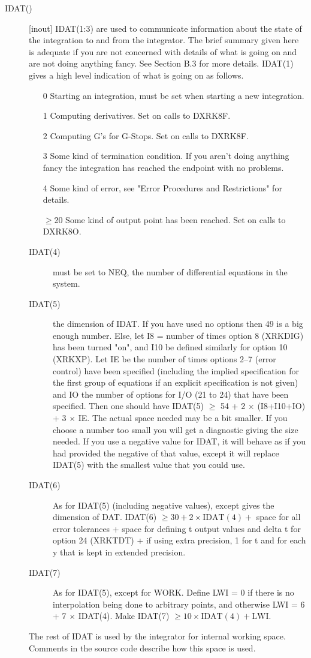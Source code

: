 \documentclass[twoside]{MATH77}
\begin{document}
\begin{description}
\item[IDAT()] [inout] IDAT(1:3) are used to communicate information
  about the state of the integration to and from the integrator.  The
  brief summary given here is adequate if you are not concerned with
  details of what is going on and are not doing anything fancy.  See
  Section B.3 for more details.  IDAT(1) gives a high level indication
  of what is going on as follows.
\begin{itemize}
\item[0] Starting an integration, must be set when starting a new
integration.
\item[1] Computing derivatives.  Set on calls to DXRK8F.
\item[2] Computing G's for G-Stops.  Set on calls to DXRK8F.
\item[3] Some kind of termination condition.  If you aren't doing
anything fancy the integration has reached the endpoint with no problems.
\item[4] Some kind of error, see "Error Procedures and
Restrictions" for details.
\item[$\geq$20] Some kind of output point has been reached.  Set on
calls to DXRK8O.
\end{itemize}
\begin{description}
\item[IDAT(4)] must be set to NEQ, the number of differential equations in
the system.
\item[IDAT(5)] the dimension of IDAT.  If you have used no options then 49
is a big enough number.  Else, let I8 = number of times option 8 (XRKDIG)
has been turned "on", and I10 be defined similarly for option 10 (XRKXP).
Let IE be the number of times options 2--7 (error
control) have been specified (including the implied specification for the
first group of equations if an explicit specification is not given) and IO
the number of options for I/O (21 to 24) that have been specified.  Then
one should have IDAT(5) $\geq$ 54 + 2 $\times$ (I8+I10+IO) + 3 $\times$
IE.  The actual space needed may be a bit smaller.  If you choose a
number too small you will get a diagnostic giving the size needed.  If you
use a negative value for IDAT, it will behave as if you had provided the
negative of that value, except it will replace IDAT(5) with the smallest
value that you could use.
\item[IDAT(6)] As for IDAT(5) (including negative values), except gives
the dimension of DAT.  IDAT(6) $\geq 30 + 2 \times \text{IDAT}(4) +$ space
for all error tolerances + space for defining t output values and delta t
for option 24 (XRKTDT) + if using extra precision, 1 for t and for each y
that is kept in extended precision.
\item[IDAT(7)] As for IDAT(5), except for WORK.  Define LWI = 0 if
  there is no interpolation being done to arbitrary points, and
  otherwise LWI = 6 + 7 $\times$ IDAT(4).  Make IDAT(7) $\geq 10
  \times \text{IDAT}(4) + \text{LWI}$.
\end{description}
The rest of IDAT is used by the integrator for internal working space.
Comments in the source code describe how this space is used.


\end{description}
\end{document}
